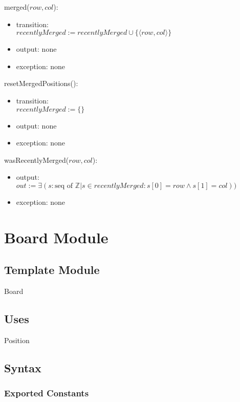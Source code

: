 \documentclass[12pt]{article}
\begin{document}
\noindent merged($row, col$):
\begin{itemize}
\item transition: \\
    $recentlyMerged := recentlyMerged \cup \{\langle row, col \rangle\}$
\item output: none
\item exception: none
\end{itemize}


\noindent resetMergedPositions():
\begin{itemize}
\item transition: \\
    $recentlyMerged := \{\}$
\item output: none
\item exception: none
\end{itemize}


\noindent wasRecentlyMerged($row, col$):
\begin{itemize}
\item output: \\
    $out := \exists(s:\text{seq of } \mathbb{Z} | s \in recentlyMerged : s[0] = row \wedge s[1] = col))$
\item exception: none
\end{itemize}

\newpage


\section* {Board Module}

\subsection*{Template Module}

Board

\subsection* {Uses}

Position

\subsection* {Syntax}

\subsubsection* {Exported Constants}
\end{document}
